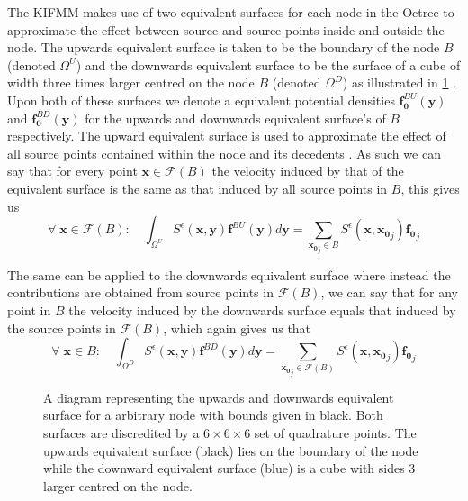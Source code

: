 The KIFMM makes use of two equivalent surfaces for each node in the Octree to approximate the effect between source and source points inside and outside the node. The upwards equivalent surface is taken to be the boundary of the node $B$ (denoted $\Omega^U$) and the downwards equivalent surface to be the surface of a cube of width three times larger centred on the node $B$ (denoted $\Omega^D$) as illustrated in \cref{fig:UpandDownsurf} \cite{Ying2004}. Upon both of these surfaces we denote a equivalent potential densities $\mathbf{f}^{BU}_\mathbf{0}(\mathbf{y})$ and $\mathbf{f}^{BD}_\mathbf{0}(\mathbf{y})$ for the upwards and downwards equivalent surface's of $B$ respectively. The upward equivalent surface is used to approximate the effect of all source points contained within the node and its decedents \cite{Rostami2016Kernel-independentStokeslets}. As such we can say that for every point $\mathbf{x}\in\mathcal{F}(B)$ the velocity induced by that of the equivalent surface is the same as that induced by all source points in $B$, this gives us
\begin{equation}
\label{eq:upsurfint}
    \forall \;\mathbf{x} \in \mathcal{F}(B): \quad \int_{\Omega^U} S^\epsilon(\mathbf{x}, \mathbf{y}) \mathbf{f}^{BU}(\mathbf{y}) d \mathbf{y}=\sum_{\mathbf{x_0}_j \in B} S^\epsilon\left(\mathbf{x}, \mathbf{x_0}_j\right) \mathbf{f_0}_{j}
\end{equation}

The same can be applied to the downwards equivalent surface where instead the contributions are obtained from source points in $\mathcal{F}(B)$, we can say that for any point in $B$ the velocity induced by the downwards surface equals that induced by the source points in $\mathcal{F}(B)$, which again gives us that
\begin{equation}
\label{eq:downsurfint}
    \forall \;\mathbf{x} \in B: \quad \int_{\Omega^D} S^\epsilon(\mathbf{x}, \mathbf{y}) \mathbf{f}^{BD}(\mathbf{y}) d \mathbf{y}=\sum_{\mathbf{x_0}_j \in \mathcal{F}(B)} S^\epsilon\left(\mathbf{x}, \mathbf{x_0}_j\right) \mathbf{f_0}_{j}
\end{equation}

\begin{figure}[ht]
    \centering
    \resizebox{.6\linewidth}{!}{}
    \caption{A diagram representing the upwards and downwards equivalent surface for a arbitrary node with bounds given in black. Both surfaces are discredited by a $6 \times 6 \times 6$ set of quadrature points. The upwards equivalent surface (black) lies on the boundary of the node while the downward equivalent surface (blue) is a cube with sides 3 larger centred on the node. }
    \label{fig:UpandDownsurf}
\end{figure}

